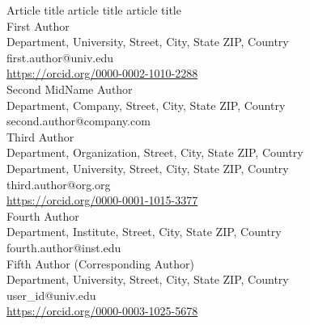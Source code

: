 \begin{center}
{\Huge Article title article title article title}
\\[5ex]

{\large First Author} \\
{\small
Department, University, Street, City, State ZIP, Country \\
first.author@univ.edu \\
\url{https://orcid.org/0000-0002-1010-2288}
} \\[1.2em]

{\large Second MidName Author} \\
{\small
Department, Company, Street, City, State ZIP, Country \\
second.author@company.com
} \\[1.2em]

{\large Third Author} \\
{\small
Department, Organization, Street, City, State ZIP, Country \\
Department, University, Street, City, State ZIP, Country \\
third.author@org.org \\
\url{https://orcid.org/0000-0001-1015-3377}
} \\[1.2em]

{\large Fourth Author} \\
{\small
Department, Institute, Street, City, State ZIP, Country \\
fourth.author@inst.edu
} \\[1.2em]

{\large Fifth Author \small(Corresponding Author)} \\
{\small
Department, University, Street, City, State ZIP, Country \\
user\_id@univ.edu \\
\url{https://orcid.org/0000-0003-1025-5678}
}
\end{center}
